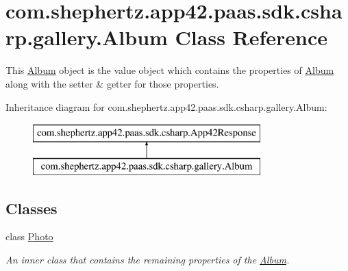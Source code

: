 \hypertarget{classcom_1_1shephertz_1_1app42_1_1paas_1_1sdk_1_1csharp_1_1gallery_1_1_album}{\section{com.\+shephertz.\+app42.\+paas.\+sdk.\+csharp.\+gallery.\+Album Class Reference}
\label{classcom_1_1shephertz_1_1app42_1_1paas_1_1sdk_1_1csharp_1_1gallery_1_1_album}
}


This \hyperlink{classcom_1_1shephertz_1_1app42_1_1paas_1_1sdk_1_1csharp_1_1gallery_1_1_album}{Album} object is the value object which contains the properties of \hyperlink{classcom_1_1shephertz_1_1app42_1_1paas_1_1sdk_1_1csharp_1_1gallery_1_1_album}{Album} along with the setter \& getter for those properties.  


Inheritance diagram for com.\+shephertz.\+app42.\+paas.\+sdk.\+csharp.\+gallery.\+Album\+:\begin{figure}[H]
\begin{center}
\leavevmode
\includegraphics[height=2.000000cm]{classcom_1_1shephertz_1_1app42_1_1paas_1_1sdk_1_1csharp_1_1gallery_1_1_album}
\end{center}
\end{figure}
\subsection*{Classes}
\begin{DoxyCompactItemize}
\item 
class \hyperlink{classcom_1_1shephertz_1_1app42_1_1paas_1_1sdk_1_1csharp_1_1gallery_1_1_album_1_1_photo}{Photo}
\begin{DoxyCompactList}\small\item\em An inner class that contains the remaining properties of the \hyperlink{classcom_1_1shephertz_1_1app42_1_1paas_1_1sdk_1_1csharp_1_1gallery_1_1_album}{Album}. \end{DoxyCompactList}\end{DoxyCompactItemize}
